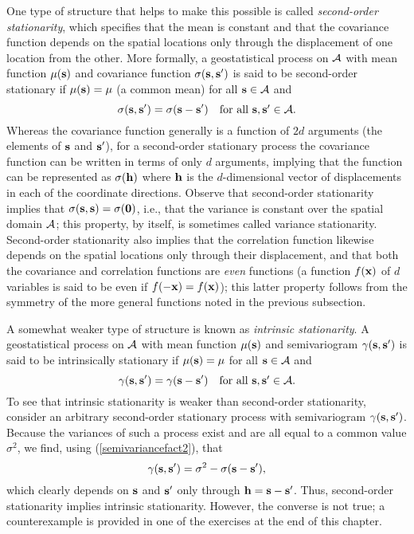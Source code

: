 One type of structure that helps to make this possible is called {\em second-order stationarity}, which specifies that the mean is constant and that the covariance function depends on the spatial locations only through the displacement of one location from the other.  More formally, a geostatistical process on ${\cal A}$ with mean function $\mu({\bf s})$ and covariance function $\sigma({\bf s},{\bf s}')$ is said to be second-order stationary if $\mu({\bf s})=\mu$ (a common mean) for all ${\bf s}\in{\cal A}$ and
\begin{equation}\label{covstationary2}
\sigma({\bf s},{\bf s}') = \sigma({\bf s}-{\bf s}')\quad\mbox{for all ${\bf s},{\bf s}'\in{\cal A}$}.
\end{equation}
Whereas the covariance function generally is a function of $2d$ arguments (the elements of ${\bf s}$ and ${\bf s}'$), for a second-order stationary process the covariance function can be written in terms of only $d$ arguments, implying that the function can be represented as $\sigma({\bf h})$ where ${\bf h}$ is the $d$-dimensional vector of displacements in each of the coordinate directions.
Observe that second-order stationarity implies that $\sigma({\bf s},{\bf s})=\sigma({\bf 0})$, i.e., that the variance is constant over the spatial domain ${\cal A}$; this property, by itself, is sometimes called variance stationarity.  Second-order stationarity also implies that the correlation function likewise depends on the spatial locations only through their displacement, and that both the covariance and correlation functions are {\em even} functions (a function $f({\bf x})$ of $d$ variables is said to be even if $f(-{\bf x})=f({\bf x})$); this latter property follows from the symmetry of the more general functions noted in the previous subsection.

A somewhat weaker type of structure is known as {\em intrinsic stationarity}.  A geostatistical process on ${\cal A}$ with mean function $\mu({\bf s})$ and semivariogram $\gamma({\bf s},{\bf s}')$ is said to be intrinsically stationary if $\mu({\bf s})=\mu$ for all ${\bf s}\in{\cal A}$ and
\begin{equation}\label{intrinsicstationary2}
\gamma({\bf s},{\bf s}') = \gamma({\bf s}-{\bf s}')\quad\mbox{for all ${\bf s},{\bf s}'\in{\cal A}$}.
\end{equation}
To see that intrinsic stationarity is weaker than second-order stationarity, consider an arbitrary second-order stationary process with semivariogram $\gamma({\bf s},{\bf s}')$.  Because the variances of such a process exist and are all equal to a common value $\sigma^2$, we find, using (\ref{semivariancefact2}), that
\[ \gamma({\bf s},{\bf s}')=\sigma^2-\sigma({\bf s}-{\bf s}'), \]
which clearly depends on ${\bf s}$ and ${\bf s}'$ only through ${\bf h}={\bf s}-{\bf s}'$.  Thus, second-order stationarity implies intrinsic stationarity.  However, the converse is not true; a counterexample is provided in one of the exercises at the end of this chapter.

